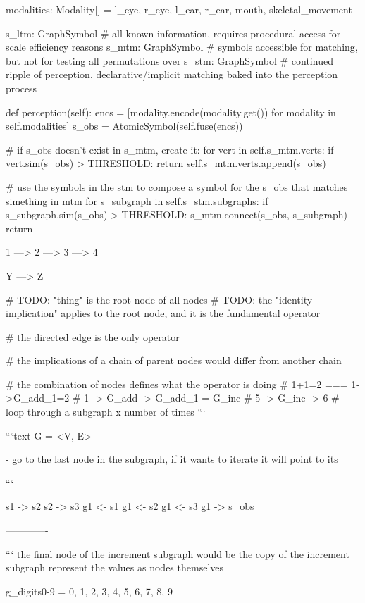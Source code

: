     modalities: Modality[] = l_eye, r_eye, l_ear, r_ear, mouth, skeletal_movement

    s_ltm: GraphSymbol # all known information, requires procedural access for scale efficiency reasons
    s_mtm: GraphSymbol # symbols accessible for matching, but not for testing all permutations over
    s_stm: GraphSymbol # continued ripple of perception, declarative/implicit matching baked into the perception process

    def perception(self):
        encs = [modality.encode(modality.get()) for modality in self.modalities]
        s_obs = AtomicSymbol(self.fuse(encs))

        # if s_obs doesn't exist in s_mtm, create it:
        for vert in self.s_mtm.verts:
            if vert.sim(s_obs) > THRESHOLD:
                return
        self.s_mtm.verts.append(s_obs)

        # use the symbols in the stm to compose a symbol for the s_obs that matches simething in mtm
        for s_subgraph in self.s_stm.subgraphs:
            if s_subgraph.sim(s_obs) > THRESHOLD:
                s_mtm.connect(s_obs, s_subgraph)
                return

1 ---> 2 ---> 3 ---> 4

Y ---> Z


# TODO: "thing" is the root node of all nodes
# TODO: the "identity implication" applies to the root node, and it is the fundamental operator

# the directed edge is the only operator

# the implications of a chain of parent nodes would differ from another chain

# the combination of nodes defines what the operator is doing
# 1+1=2 === 1->G_add_1=2
# 1 -> G_add -> G_add_1 = G_inc
# 5 -> G_inc -> 6
# loop through a subgraph x number of times
```

```text
G = <V, E>

- go to the last node in the subgraph, if it wants to iterate it will point to its 


```


s1 -> s2
s2 -> s3
g1 <- s1
g1 <- s2
g1 <- s3
g1 -> s_obs


-------------

```
the final node of the increment subgraph would be the copy of the increment subgraph
represent the values as nodes themselves

g_digits0-9 = {0, 1, 2, 3, 4, 5, 6, 7, 8, 9}


